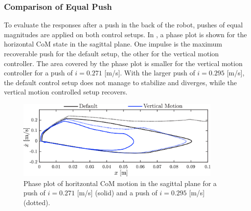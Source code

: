 \subsubsection{Comparison of Equal Push}
To evaluate the responses after a push in the back of the robot, pushes of equal magnitudes are applied on both control setups. In , a phase plot is shown for the horizontal \ac{CoM} state in the sagittal plane. One impulse is the maximum recoverable push for the default setup, the other for the vertical motion controller. The area covered by the phase plot is smaller for the vertical motion controller for a push of $i=0.271$ [m/s]. With the larger push of $i=0.295$ [m/s], the default control setup does not manage to stabilize and diverges, while the vertical motion controlled setup recovers.
\begin{figure}
\centering
\includegraphics[width=0.9\textwidth]{STYLESTUFF/valcomparephase.png}
\caption{Phase plot of horitzontal \ac{CoM} motion in the sagittal plane for a push of $i=0.271$ [m/s] (solid) and a push of $i=0.295$ [m/s] (dotted).}
\label{fig:valcomparephase}
\end{figure}

